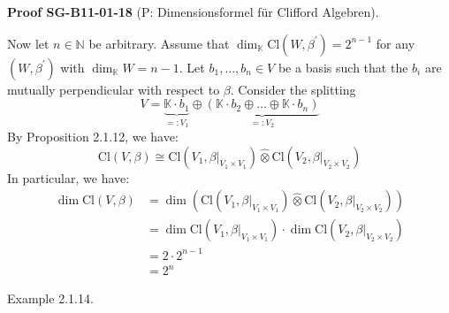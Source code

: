 \documentclass[10pt, letterpaper]{article}
\newcommand{\CustomHeading}[3]{%
  \par\medskip\noindent%
  \textbf{#1 #2} \textnormal{(#3)}.\enskip%
}
\newenvironment{PROOF}[2]{\begin{unitbox}\CustomHeading{Proof}{#1}{#2}}{\end{unitbox}}
\begin{document}
\begin{PROOF}{SG-B11-01-18}{P: Dimensionsformel für Clifford Algebren}
Now let $n \in \mathbb{N}$ be arbitrary. Assume that $\operatorname{dim}_{\mathbb{K}} \mathrm{Cl}\left(W, \beta^{\prime}\right)=2^{n-1}$ for any $\left(W, \beta^{\prime}\right)$ with $\operatorname{dim}_{\mathbb{K}} W=n-1$. Let $b_{1}, \ldots, b_{n} \in V$ be a basis such that the $b_{i}$ are mutually perpendicular with respect to $\beta$. Consider the splitting
$$
V=\underbrace{\mathbb{K} \cdot b_{1}}_{=: V_{1}} \oplus \underbrace{\left(\mathbb{K} \cdot b_{2} \oplus \ldots \oplus \mathbb{K} \cdot b_{n}\right)}_{=: V_{2}}
$$
By Proposition 2.1.12, we have:
$$
\mathrm{Cl}(V, \beta) \cong \mathrm{Cl}\left(V_{1},\left.\beta\right|_{V_{1} \times V_{1}}\right) \hat{\otimes} \mathrm{Cl}\left(V_{2},\left.\beta\right|_{V_{2} \times V_{2}}\right)
$$
In particular, we have:
$$
\begin{aligned}
\operatorname{dim} \mathrm{Cl}(V, \beta) & =\operatorname{dim}\left(\mathrm{Cl}\left(V_{1},\left.\beta\right|_{V_{1} \times V_{1}}\right) \hat{\otimes} \mathrm{Cl}\left(V_{2},\left.\beta\right|_{V_{2} \times V_{2}}\right)\right) \\
& =\operatorname{dim} \mathrm{Cl}\left(V_{1},\left.\beta\right|_{V_{1} \times V_{1}}\right) \cdot \operatorname{dim} \mathrm{Cl}\left(V_{2},\left.\beta\right|_{V_{2} \times V_{2}}\right) \\
& =2 \cdot 2^{n-1} \\
& =2^{n}
\end{aligned}
$$
\end{PROOF}




Example 2.1.14. 
\end{document}
